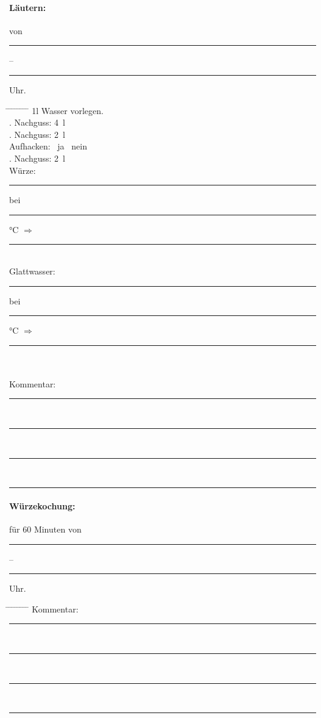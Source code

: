 \documentclass[12pt,oneside,a4paper]{scrartcl}
\newcommand{\Zeitluecke}{\rule[-0.1cm]{1.8cm}{0.5pt}}
\begin{document}
{\paragraph{Läutern:} von \Zeitluecke -- \Zeitluecke Uhr.
	\begin{tabbing}
		\hspace{1cm} \= \hspace{1cm} \= \hspace{1cm} \= \hspace{1cm} \= \hspace{1cm} \=\hspace{1cm} \=\hspace{1cm} \=\hspace{1cm} \= \kill
		\> 1l Wasser vorlegen.\\
		\> . Nachguss: \> \> \> \SI{4}{\litre}\\
		\> . Nachguss: \> \> \> \SI{2}{\litre}\\
		\> \> \> Aufhacken: \> \> \Square \ ja \> \> \Square \ nein\\
		\> . Nachguss: \> \> \> \SI{2}{\litre}\\
		\> Würze: \> \> \> \rule[-0.1cm]{0.6cm}{0.5pt}\si{\plato} \> bei \> \rule[-0.1cm]{0.6cm}{0.5pt}\si{\degreeCelsius} \> $\Rightarrow$ \> \rule[-0.1cm]{0.6cm}{0.5pt}\si{\plato}\\
		\> Glattwasser: \> \> \> \rule[-0.1cm]{0.6cm}{0.5pt}\si{\plato} \> bei \> \rule[-0.1cm]{0.6cm}{0.5pt}\si{\degreeCelsius} \> $\Rightarrow$ \> \rule[-0.1cm]{0.6cm}{0.5pt}\si{\plato}\\\\
		\> Kommentar: \>\>\> \rule[-0.1cm]{13cm}{0.5pt}\\
			\> \>  \rule[-0.1cm]{15.3cm}{0.5pt}\\
			\> \>  \rule[-0.1cm]{15.3cm}{0.5pt}\\
			\> \>  \rule[-0.1cm]{15.3cm}{0.5pt}		
	\end{tabbing}
%
\paragraph{Würzekochung:} für 60 Minuten von \Zeitluecke -- \Zeitluecke Uhr.
	\begin{tabbing}
		\hspace{1cm} \= \hspace{1cm} \= \hspace{1cm} \= \hspace{1cm} \= \hspace{1cm} \= \hspace{1cm} \= \hspace{1cm} \= \hspace{1cm} \= \kill
		\> Kommentar: \>\>\> \rule[-0.1cm]{13cm}{0.5pt}\\
			\> \>  \rule[-0.1cm]{15.3cm}{0.5pt}\\
			\> \>  \rule[-0.1cm]{15.3cm}{0.5pt}\\
			\> \>  \rule[-0.1cm]{15.3cm}{0.5pt}		
	\end{tabbing}
}
\end{document}
